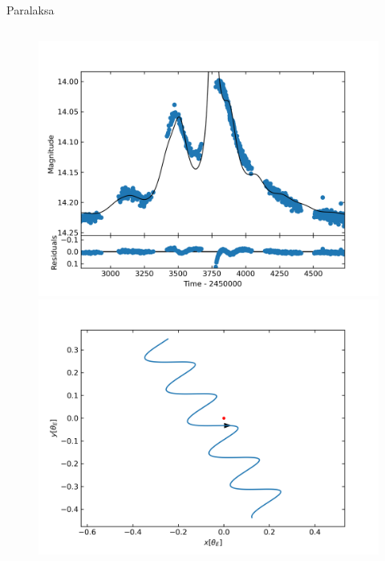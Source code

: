 \documentclass{beamer}
\begin{document}
\begin{frame}{Paralaksa}
\begin{columns}
        \begin{column}{0.45\linewidth}
            \begin{figure}
                \centering
                \includegraphics[width = \textwidth]{../sim30/parallax/png/PAR-01-noaver.dat-.png}
                \includegraphics[width = \textwidth]{../sim30/parallax/png/PAR-01-noaver.dat-.trj.png}

            \end{figure}
        \end{column}
    \end{columns}

\end{frame}
\end{document}
